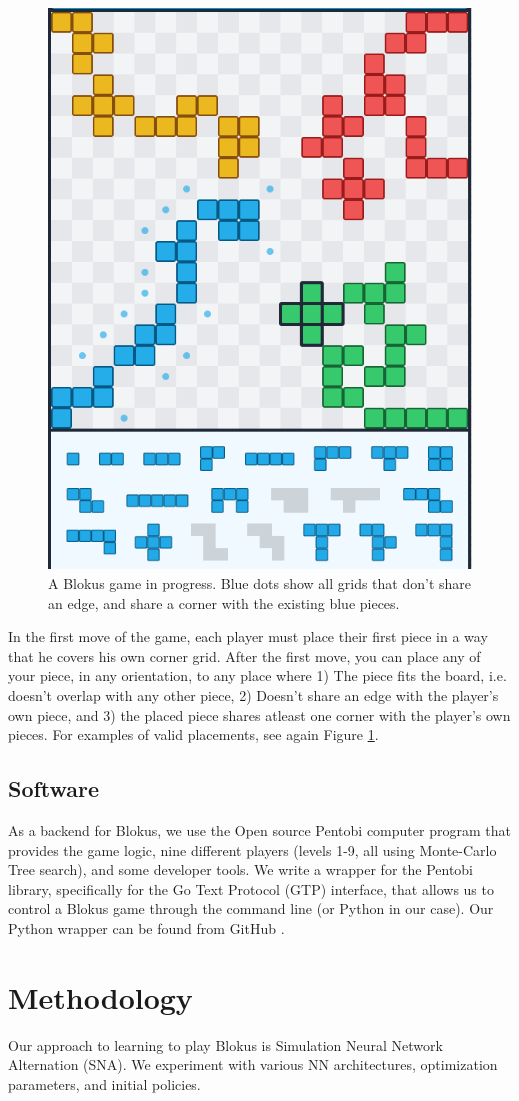 \documentclass{article}
\begin{document}
\begin{figure}[h]
    \centering
    \includegraphics[width=0.4\linewidth]{blokus_board.png}
    \caption{A Blokus game in progress. Blue dots show all
    grids that don't share an edge, and share a corner with
    the existing blue pieces.}
    \label{fig:blokus_board}
\end{figure}


In the first move of the game, each player must place their
first piece in a way that he covers his own corner grid.
After the first move, you can place any of your piece, in any
orientation, to any place where 1) The piece fits the board,
i.e. doesn't overlap with any other piece, 2) Doesn't share an
edge with the player's own piece, and 3) the placed piece shares
atleast one corner with the player's own pieces. For examples of
valid placements, see again Figure \ref{fig:blokus_board}.

\subsection{Software}
As a backend for Blokus, we use the Open source Pentobi
\cite{Enzenberger2011Pentobi} computer program that provides
the game logic, nine different players (levels 1-9, all using
Monte-Carlo Tree search), and some developer tools. We write
a wrapper for the Pentobi library, specifically for the Go Text
Protocol (GTP) interface, that allows us to control a Blokus
game through the command line (or Python in our case). Our
Python wrapper can be found from GitHub
\cite{Vahteristo2024PythonBlokus}.


\section{Methodology}

Our approach to learning to play Blokus is Simulation
Neural Network Alternation (SNA). We experiment with
various NN architectures, optimization parameters, and
initial policies.
\end{document}
